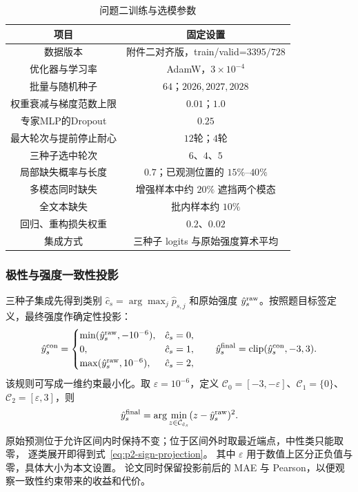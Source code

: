 \documentclass[bwprint]{gmcmthesis}
\begin{document}
\begin{table}[htbp]
 \centering
 \caption{问题二训练与选模参数}
 \label{tab:p2-training-config}
 \begin{tabular*}{\linewidth}{@{\extracolsep{\fill}}cc@{}}
 \toprule
 项目 & 固定设置 \\
 \midrule
 数据版本 & 附件二对齐版，train/valid=$3395/728$ \\
 优化器与学习率 & AdamW，$3\times10^{-4}$ \\
 批量与随机种子 & $64$；$2026,2027,2028$ \\
 权重衰减与梯度范数上限 & $0.01$；$1.0$ \\
 专家MLP的Dropout & $0.25$ \\
 最大轮次与提前停止耐心 & $12$轮；$4$轮 \\
 三种子选中轮次 & $6$、$4$、$5$ \\
 局部缺失概率与长度 & $0.7$；已观测位置的 $15\%$--$40\%$ \\
 多模态同时缺失 & 增强样本中约 $20\%$ 遮挡两个模态 \\
 全文本缺失 & 批内样本约 $10\%$ \\
 回归、重构损失权重 & $0.2$、$0.02$ \\
 集成方式 & 三种子 logits 与原始强度算术平均 \\
 \bottomrule
 \end{tabular*}
\end{table}

\subsubsection{极性与强度一致性投影}

三种子集成先得到类别 $\hat c_s=\arg\max_j\hat p_{s,j}$ 和原始强度
$\hat y_s^{\rm raw}$。按照题目标签定义，最终强度作确定性投影：
\begin{equation}
 \hat y_s^{\rm con}=\begin{cases}
 \min(\hat y_s^{\rm raw},-10^{-6}),&\hat c_s=0,\\0,&\hat c_s=1,\\
 \max(\hat y_s^{\rm raw},10^{-6}),&\hat c_s=2,
 \end{cases}\qquad
 \hat y_s^{\rm final}=\operatorname{clip}(\hat y_s^{\rm con},-3,3).
 \label{eq:p2-sign-projection}
\end{equation}
该规则可写成一维约束最小化。取 $\varepsilon=10^{-6}$，定义
$\mathcal C_0=[-3,-\varepsilon]$、$\mathcal C_1=\{0\}$、
$\mathcal C_2=[\varepsilon,3]$，则
\[
 \hat y_s^{\rm final}=\arg\min_{z\in\mathcal C_{\hat c_s}}
 (z-\hat y_s^{\rm raw})^2.
\]
原始预测位于允许区间内时保持不变；位于区间外时取最近端点，中性类只能取零，
逐类展开即得到式~\eqref{eq:p2-sign-projection}。
其中 $\varepsilon$ 用于数值上区分正负值与零，具体大小为本文设置。
论文同时保留投影前后的
MAE 与 Pearson，以便观察一致性约束带来的收益和代价。
\end{document}
